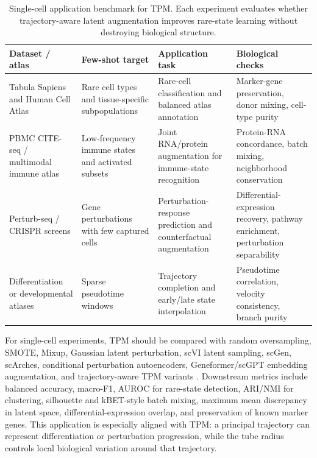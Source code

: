 \documentclass{article}
\begin{document}
\begin{table}[t]
	\centering
	\caption{Single-cell application benchmark for TPM. Each experiment evaluates whether trajectory-aware latent augmentation improves rare-state learning without destroying biological structure.}
	\label{table:single_cell_benchmark}
	\small
	\setlength{\tabcolsep}{4.3pt}
	\renewcommand{\arraystretch}{1.18}
	\begin{tabular}{L{0.20\textwidth}L{0.22\textwidth}L{0.26\textwidth}L{0.23\textwidth}}
		\toprule
		Dataset / atlas & Few-shot target & Application task & Biological checks \\
		\midrule
		Tabula Sapiens and Human Cell Atlas \citep{tabula2022single, regev2017human} & Rare cell types and tissue-specific subpopulations & Rare-cell classification and balanced atlas annotation & Marker-gene preservation, donor mixing, cell-type purity \\
		PBMC CITE-seq / multimodal immune atlas \citep{hao2021integrated} & Low-frequency immune states and activated subsets & Joint RNA/protein augmentation for immune-state recognition & Protein-RNA concordance, batch mixing, neighborhood conservation \\
		Perturb-seq / CRISPR screens \citep{dixit2016perturbseq, replogle2022mapping} & Gene perturbations with few captured cells & Perturbation-response prediction and counterfactual augmentation & Differential-expression recovery, pathway enrichment, perturbation separability \\
		Differentiation or developmental atlases & Sparse pseudotime windows & Trajectory completion and early/late state interpolation & Pseudotime correlation, velocity consistency, branch purity \\
		\bottomrule
	\end{tabular}
\end{table}

For single-cell experiments, TPM should be compared with random oversampling, SMOTE, Mixup, Gaussian latent perturbation, scVI latent sampling, scGen, scArches, conditional perturbation autoencoders, Geneformer/scGPT embedding augmentation, and trajectory-aware TPM variants \citep{chawla2002smote, zhang2018mixup, lopez2018deep, lotfollahi2019scgen, lotfollahi2022mapping, lotfollahi2023predicting, theodoris2023transfer, cui2024scgpt}. Downstream metrics include balanced accuracy, macro-F1, AUROC for rare-state detection, ARI/NMI for clustering, silhouette and kBET-style batch mixing, maximum mean discrepancy in latent space, differential-expression overlap, and preservation of known marker genes. This application is especially aligned with TPM: a principal trajectory can represent differentiation or perturbation progression, while the tube radius controls local biological variation around that trajectory.
\end{document}
